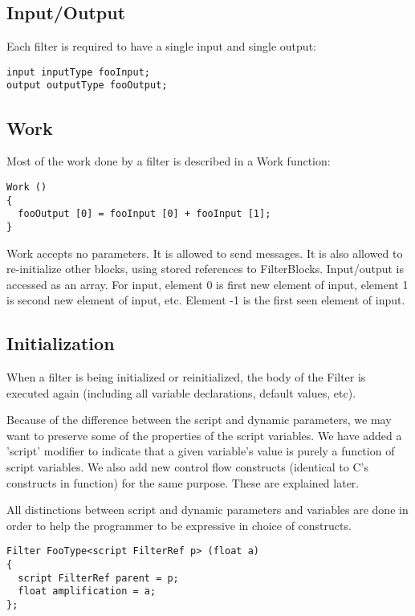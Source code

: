 \documentclass[twocolumn, draft]{article}
\begin{document}
\subsection{Input/Output}

Each filter is required to have a single input and single output:
\begin{verbatim}
input inputType fooInput;
output outputType fooOutput;
\end{verbatim}

\subsection{Work}

Most of the work done by a filter is described in a Work function:

\begin{verbatim}
Work ()
{
  fooOutput [0] = fooInput [0] + fooInput [1];
}
\end{verbatim}

Work accepts no parameters.  It is allowed to send messages.  It is also
allowed to re-initialize other blocks, using stored references to
FilterBlocks.
Input/output
is accessed as an array.  For input, element 0 is first new element of input,
element 1 is second new element of input, etc.  Element -1 is the first seen
element of input.

\subsection{Initialization}

When a filter is being initialized or reinitialized, the body of the
Filter is executed again (including all variable declarations, default
values, etc).

Because of the difference between the script and dynamic parameters,
we may want to preserve some of the properties of the script variables.
We have added a 'script' modifier to indicate that a given variable's
value is purely a function of script variables.  We also add new control
flow constructs (identical to C's constructs in function) for the same purpose.
These are explained later.

All distinctions between script and dynamic parameters and variables
are done in order to help the programmer to be expressive in choice of
constructs.

\begin{verbatim}
Filter FooType<script FilterRef p> (float a)
{
  script FilterRef parent = p;
  float amplification = a;
};
\end{verbatim}
\end{document}
